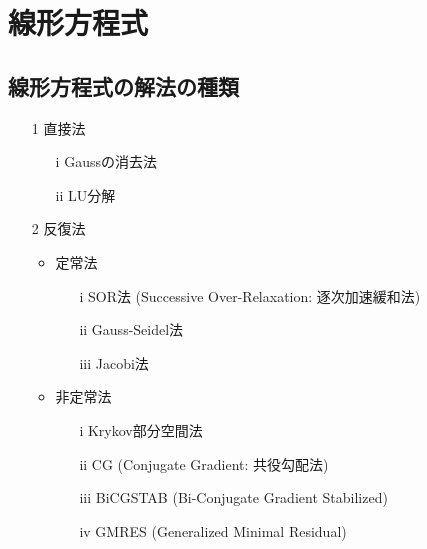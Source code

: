 \chapter{線形方程式}

\section{線形方程式の解法の種類}
\begin{itemize}
\item[1] 直接法
	\begin{itemize}
	\item[i] Gaussの消去法
	\item[ii] LU分解
	\end{itemize}
\item[2] 反復法
	\begin{itemize}
	\item 定常法
		\begin{itemize}	
		\item[i] SOR法 (Successive Over-Relaxation: 逐次加速緩和法)
		\item[ii] Gauss-Seidel法
		\item[iii] Jacobi法
		\end{itemize}
	\item 非定常法
		\begin{itemize}
		\item[i] Krykov部分空間法
		\item[ii] CG (Conjugate Gradient: 共役勾配法)
		\item[iii] BiCGSTAB (Bi-Conjugate Gradient Stabilized)
		\item[iv] GMRES (Generalized Minimal Residual)
		\end{itemize}
	\end{itemize}
\end{itemize}



